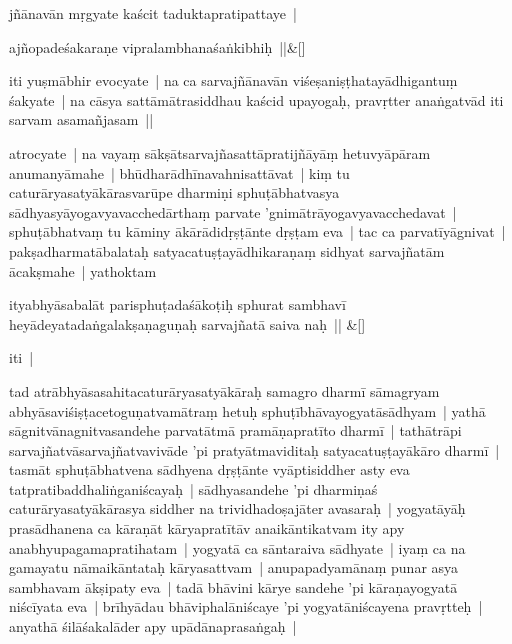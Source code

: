 \documentclass[article,12pt,a4paper]{memoir}%
\newcounter{parCount}
\begin{document}
	  
	  \pstart \leavevmode%
	jñānavān mṛgyate kaścit taduktapratipattaye | 
	{}
	\pend%
      
	    
	    \stanza[\smallbreak]
	  ajñopadeśakaraṇe vipralambhanaśaṅkibhiḥ ||\&[\smallbreak]
	  
	  
	  

	  
	  \pstart \leavevmode%
	iti yuṣmābhir evocyate | na ca sarvajñānavān viśeṣaniṣṭhatayādhigantuṃ śakyate | na cāsya sattāmātrasiddhau kaścid upayogaḥ, pravṛtter anaṅgatvād iti sarvam asamañjasam || 
	{}
	\pend%
      

	  
	  \pstart \leavevmode%
	\label{thakur75-4.24}atrocyate | na vayaṃ sākṣātsarvajñasattāpratijñāyāṃ hetuvyāpāram anumanyāmahe | bhūdharādhīnavahnisattāvat | kiṃ tu caturāryasatyākārasvarūpe dharmiṇi sphuṭābhatvasya sādhyasyāyogavyavacchedārthaṃ parvate 'gnimātrāyogavyavacchedavat | sphuṭābhatvaṃ tu kāminy ākārādidṛṣṭānte dṛṣṭam eva | tac ca parvatīyāgnivat | pakṣadharmatābalataḥ satyacatuṣṭayādhikaraṇaṃ sidhyat sarvajñatām ācakṣmahe | yathoktam 
	{}
	\pend%
      
	    
	    \stanza[\smallbreak]
	  ityabhyāsabalāt parisphuṭadaśākoṭiḥ sphurat sambhavī heyādeyatadaṅgalakṣaṇaguṇaḥ sarvajñatā saiva naḥ || \&[\smallbreak]
	  
	  
	  

	  
	  \pstart \leavevmode%
	iti | 
	{}
	\pend%
      

	  
	  \pstart \leavevmode%
	\label{thakur75-4.31}tad atrābhyāsasahitacaturāryasatyākāraḥ samagro dharmī sāmagryam abhyāsaviśiṣṭacetoguṇatvamātraṃ hetuḥ sphuṭībhāvayogyatāsādhyam | yathā sāgnitvānagnitvasandehe parvatātmā pramāṇapratīto dharmī | tathātrāpi sarvajñatvāsarvajñatvavivāde 'pi pratyātmaviditaḥ satyacatuṣṭayākāro dharmī | tasmāt sphuṭābhatvena sādhyena dṛṣṭānte vyāptisiddher asty eva tatpratibaddhaliṅganiścayaḥ | sādhyasandehe 'pi dharmiṇaś caturāryasatyākārasya siddher na trividhadoṣajāter avasaraḥ | yogyatāyāḥ prasādhanena ca kāraṇāt kāryapratītāv anaikāntikatvam ity apy anabhyupagamapratihatam | yogyatā ca sāntaraiva sādhyate | iyaṃ ca na gamayatu nāmaikāntataḥ kāryasattvam | anupapadyamānaṃ punar asya sambhavam ākṣipaty eva | tadā bhāvini kārye sandehe 'pi kāraṇayogyatā niścīyata eva | brīhyādau bhāviphalāniścaye 'pi yogyatāniścayena pravṛtteḥ | anyathā śilāśakalāder apy upādānaprasaṅgaḥ | 
	{}
	\pend%
      
\end{document}

